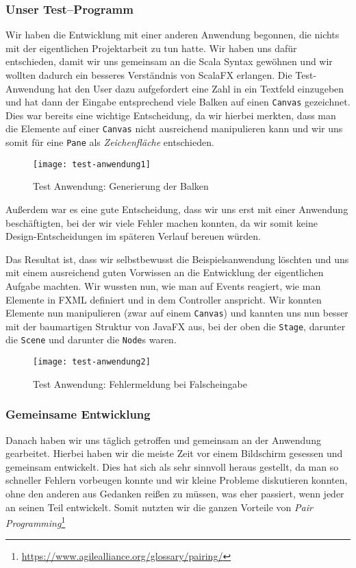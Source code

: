 \subsubsection{Unser Test--Programm}
Wir haben die Entwicklung mit einer anderen Anwendung begonnen, die nichts mit der eigentlichen Projektarbeit zu tun hatte. Wir haben uns dafür entschieden, damit wir uns gemeinsam an die Scala Syntax gewöhnen und wir wollten dadurch ein besseres Verständnis von ScalaFX erlangen. Die Test-Anwendung hat den User dazu aufgefordert eine Zahl in ein Textfeld einzugeben und hat dann der Eingabe entsprechend viele Balken auf einen \texttt{Canvas} gezeichnet. Dies war bereits eine wichtige Entscheidung, da wir hierbei merkten, dass man die Elemente auf einer \texttt{Canvas} nicht ausreichend manipulieren kann und wir uns somit für eine \texttt{Pane} als \textit{Zeichenfläche} entschieden.

\begin{figure}[!htb]
    \centering
      \texttt{[image: test-anwendung1]}
    \caption{Test Anwendung: Generierung der Balken}
\end{figure}

Außerdem war es eine gute Entscheidung, dass wir uns erst mit einer Anwendung beschäftigten, bei der wir viele Fehler machen konnten, da wir somit keine Design-Entscheidungen im späteren Verlauf bereuen würden.


Das Resultat ist, dass wir selbstbewusst die Beispielsanwendung löschten und uns mit einem ausreichend guten Vorwissen an die Entwicklung der eigentlichen Aufgabe machten. Wir wussten nun, wie man auf Events reagiert, wie man Elemente in FXML definiert und in dem Controller anspricht. Wir konnten Elemente nun manipulieren (zwar auf einem \texttt{Canvas}) und kannten uns nun besser mit der baumartigen Struktur von JavaFX aus, bei der oben die \texttt{Stage}, darunter die \texttt{Scene} und darunter die \texttt{Node}s waren.


\begin{figure}[!htb]
    \centering
      \texttt{[image: test-anwendung2]}
    \caption{Test Anwendung: Fehlermeldung bei Falscheingabe}
\end{figure}

\subsubsection{Gemeinsame Entwicklung}
Danach haben wir uns täglich getroffen und gemeinsam an der Anwendung gearbeitet. Hierbei haben wir die meiste Zeit vor einem Bildschirm gesessen und gemeinsam entwickelt. Dies hat sich als sehr sinnvoll heraus gestellt, da man so schneller Fehlern vorbeugen konnte und wir kleine Probleme diskutieren konnten, ohne den anderen aus Gedanken reißen zu müssen, was eher passiert, wenn jeder an seinen Teil entwickelt. Somit nutzten wir die ganzen Vorteile von \textit{Pair Programming}\footnote{\url{https://www.agilealliance.org/glossary/pairing/}}

